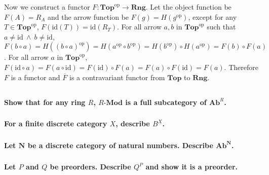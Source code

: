 \documentclass{article}
\begin{document}
Now we construct a functor $F : \mathbf{Top}^{\mathrm{op}} \rightarrow \mathbf{Rng}$. Let the object function be $F(A) = R_A$ and the arrow function be $F(g) = H(g^{\mathrm{op}})$, except for any $T \in \mathbf{Top}^{\mathrm{op}}$, $F(\mathrm{id}(T)) = \mathrm{id}(R_T)$. For all arrow $a, b$ in $\mathbf{Top}^{\mathrm{op}}$ such that $a \neq \mathrm{id}\ \wedge\ b \neq \mathrm{id}$, $F(b \circ a) = H((b \circ a)^{\mathrm{op}}) = H(a^{\mathrm{op}} \circ b^{\mathrm{op}}) = H(b^{\mathrm{op}}) \circ H(a^{\mathrm{op}}) = F(b) \circ F(a)$. For all arrow $a$ in $\mathbf{Top}^{\mathrm{op}}$, $F(\mathrm{id} \circ a) = F(a \circ \mathrm{id}) = F(\mathrm{id}) \circ F(a) = F(a) \circ F(\mathrm{id}) = F(a)$. Therefore $F$ is a functor and $\overline{F}$ is a contravariant functor from $\mathbf{Top}$ to $\mathbf{Rng}$.

\subsection{}

\subsubsection{}

\textbf{Show that for any ring $R$, $R\text{-}\mathbf{Mod}$ is a full subcategory of $\mathbf{Ab}^R$.}

\subsubsection{}

\textbf{For a finite discrete category $X$, describe $B^X$.}

\subsubsection{}

\textbf{Let $\mathbf{N}$ be a discrete category of natural numbers. Describe $\mathbf{Ab}^{\mathbf{N}}$.}

\subsubsection{}

\textbf{Let $P$ and $Q$ be preorders. Describe $Q^P$ and show it is a preorder.}

\subsubsection{}
\end{document}
